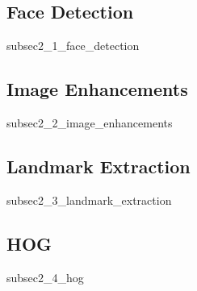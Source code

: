 \subsection{Face Detection}
{subsec2_1_face_detection}

\subsection{Image Enhancements}
{subsec2_2_image_enhancements}

\subsection{Landmark Extraction}
{subsec2_3_landmark_extraction}

\subsection{HOG}
{subsec2_4_hog}


